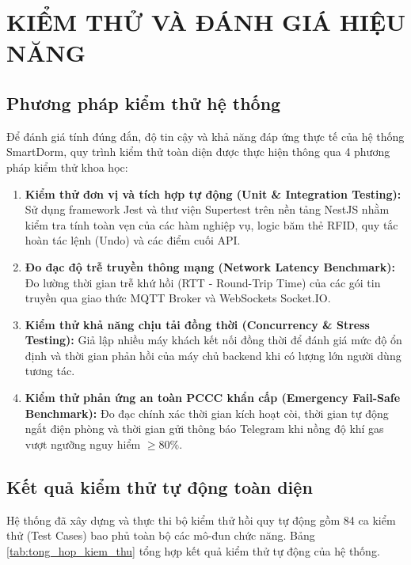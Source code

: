 \chapter{KIỂM THỬ VÀ ĐÁNH GIÁ HIỆU NĂNG}
\label{ch:chuong5}

\section{Phương pháp kiểm thử hệ thống}
\label{sec:phuong_phap_kiem_thu}

Để đánh giá tính đúng đắn, độ tin cậy và khả năng đáp ứng thực tế của hệ thống SmartDorm, quy trình kiểm thử toàn diện được thực hiện thông qua 4 phương pháp kiểm thử khoa học:
\begin{enumerate}
    \item \textbf{Kiểm thử đơn vị và tích hợp tự động (Unit \& Integration Testing):} Sử dụng framework Jest và thư viện Supertest trên nền tảng NestJS nhằm kiểm tra tính toàn vẹn của các hàm nghiệp vụ, logic băm thẻ RFID, quy tắc hoàn tác lệnh (Undo) và các điểm cuối API.
    \item \textbf{Đo đạc độ trễ truyền thông mạng (Network Latency Benchmark):} Đo lường thời gian trễ khứ hồi (RTT - Round-Trip Time) của các gói tin truyền qua giao thức MQTT Broker và WebSockets Socket.IO.
    \item \textbf{Kiểm thử khả năng chịu tải đồng thời (Concurrency \& Stress Testing):} Giả lập nhiều máy khách kết nối đồng thời để đánh giá mức độ ổn định và thời gian phản hồi của máy chủ backend khi có lượng lớn người dùng tương tác.
    \item \textbf{Kiểm thử phản ứng an toàn PCCC khẩn cấp (Emergency Fail-Safe Benchmark):} Đo đạc chính xác thời gian kích hoạt còi, thời gian tự động ngắt điện phòng và thời gian gửi thông báo Telegram khi nồng độ khí gas vượt ngưỡng nguy hiểm $\ge 80\%$.
\end{enumerate}

\section{Kết quả kiểm thử tự động toàn diện}
\label{sec:ket_qua_kiem_thu_tu_dong}

Hệ thống đã xây dựng và thực thi bộ kiểm thử hồi quy tự động gồm 84 ca kiểm thử (Test Cases) bao phủ toàn bộ các mô-đun chức năng. Bảng \ref{tab:tong_hop_kiem_thu} tổng hợp kết quả kiểm thử tự động của hệ thống.


